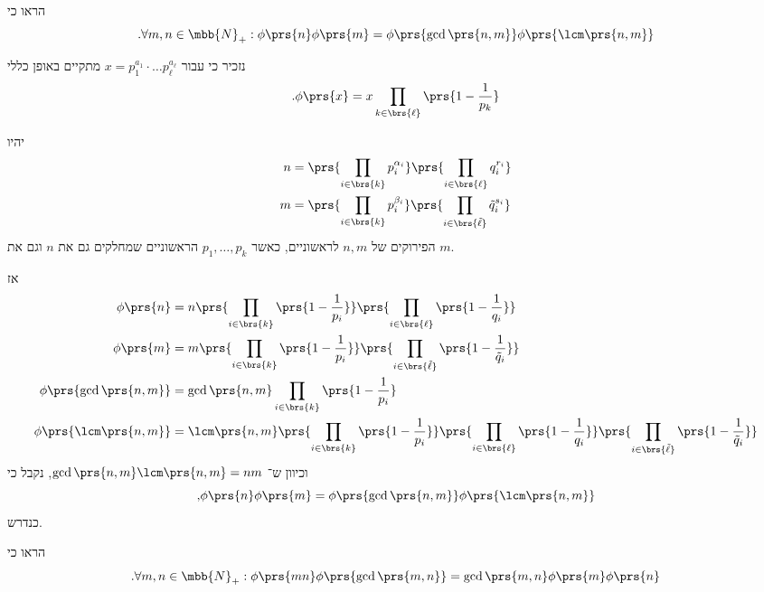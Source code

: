 \documentclass[a4paper,10pt,twoside,openany]{book}
\begin{document}
\begin{exercisechap}
הראו כי
\[\text{.} \forall m,n \in \mbb{N}_+ : \phi\prs{n} \phi\prs{m} = \phi\prs{\gcd\prs{n,m}} \phi\prs{\lcm\prs{n,m}}\]
\end{exercisechap}

\begin{solution}
נזכיר כי עבור
$x = p_1^{a_1} \cdot \ldots p_{\ell}^{a_{\ell}}$
מתקיים באופן כללי
\[\text{.} \phi\prs{x} = x \prod_{k \in \brs{\ell}} \prs{1 - \frac{1}{p_k}}\]

יהיו
\begin{align*}
n &= \prs{\prod_{i \in \brs{k}} p_i^{\alpha_i}} \prs{\prod_{i \in \brs{\ell}} q_i^{r_i}} \\
m &= \prs{\prod_{i \in \brs{k}} p_i^{\beta_i}} \prs{\prod_{i \in \brs{\tilde{\ell}}} \tilde{q}_i^{s_i}}
\end{align*}
הפירוקים של
$n,m$
לראשוניים, כאשר
$p_1, \ldots, p_k$
הראשוניים שמחלקים גם את
$n$
וגם את
$m$.

אז
\begin{align*}
\phi\prs{n} &= n \prs{\prod_{i \in \brs{k}} \prs{1 - \frac{1}{p_i}}} \prs{\prod_{i \in \brs{\ell}} \prs{1 - \frac{1}{q_i}}}
\\
\phi\prs{m} &= m  \prs{\prod_{i \in \brs{k}} \prs{1 - \frac{1}{p_i}}} \prs{\prod_{i \in \brs{\tilde{\ell}}} \prs{1 - \frac{1}{\tilde{q}_i}}}
\\
\phi\prs{\gcd\prs{n,m}} &= \gcd\prs{n,m} \prod_{i \in \brs{k}} \prs{1 - \frac{1}{p_i}}
\\
\phi\prs{\lcm\prs{n,m}} &= \lcm\prs{n,m} \prs{\prod_{i \in \brs{k}} \prs{1 - \frac{1}{p_i}}} \prs{\prod_{i \in \brs{\ell}} \prs{1 - \frac{1}{q_i}}} \prs{\prod_{i \in \brs{\tilde{\ell}}} \prs{1 - \frac{1}{\tilde{q}_i}}}
\end{align*}
וכיוון ש־%
$\gcd\prs{n,m} \lcm\prs{n,m} = nm$,
נקבל כי
\[\text{,}\phi\prs{n} \phi\prs{m} = \phi\prs{\gcd\prs{n,m}} \phi\prs{\lcm\prs{n,m}}\]
כנדרש.
\end{solution}

\begin{exercisechap}
הראו כי
\[\text{.} \forall m,n \in \mbb{N}_+ : \phi\prs{mn} \phi\prs{\gcd\prs{m,n}} = \gcd\prs{m,n} \phi\prs{m} \phi\prs{n}\]
\end{exercisechap}
\end{document}
